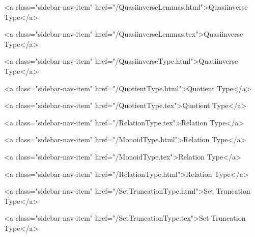       
    
      
        
          <a class="sidebar-nav-item" href="/QuasiinverseLemmas.html">Quasiinverse Type</a>
        
      
    
      
        
          <a class="sidebar-nav-item" href="/QuasiinverseLemmas.tex">Quasiinverse Type</a>
        
      
    
      
        
          <a class="sidebar-nav-item" href="/QuasiinverseType.html">Quasiinverse Type</a>
        
      
    
      
        
          <a class="sidebar-nav-item" href="/QuotientType.html">Quotient Type</a>
        
      
    
      
        
          <a class="sidebar-nav-item" href="/QuotientType.tex">Quotient Type</a>
        
      
    
      
        
          <a class="sidebar-nav-item" href="/RelationType.tex">Relation Type</a>
        
      
    
      
        
          <a class="sidebar-nav-item" href="/MonoidType.html">Relation Type</a>
        
      
    
      
        
          <a class="sidebar-nav-item" href="/MonoidType.tex">Relation Type</a>
        
      
    
      
        
          <a class="sidebar-nav-item" href="/RelationType.html">Relation Type</a>
        
      
    
      
        
          <a class="sidebar-nav-item" href="/SetTruncationType.html">Set Truncation Type</a>
        
      
    
      
        
          <a class="sidebar-nav-item" href="/SetTruncationType.tex">Set Truncation Type</a>
        
